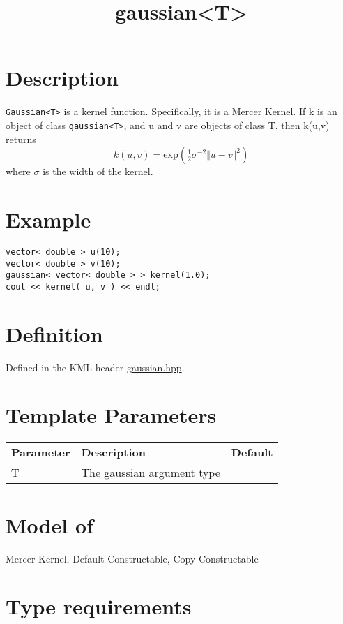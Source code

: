 \documentclass{article}
\newcommand{\half}{\tfrac{1}{2}}
\begin{document}
\title{gaussian<T>}
\maketitle

\section*{Description}

\texttt{Gaussian<T>} is a kernel function. Specifically, it is a Mercer Kernel. If k is an object of class \texttt{gaussian<T>}, and u and v are objects of class T, then k(u,v) returns
%
$$k(u,v) = \textrm{exp}( \half \sigma^{-2} \Vert u-v \Vert^2 ) $$
%
where $\sigma$ is the width of the kernel. 


\section*{Example}


\highlightcpp{}
\begin{verbatim}
vector< double > u(10);
vector< double > v(10);
gaussian< vector< double > > kernel(1.0);
cout << kernel( u, v ) << endl;
\end{verbatim}


\section*{Definition}

Defined in the KML header \href{gaussian.hpp}{gaussian.hpp}.


\section*{Template Parameters}

\begin{tabular}{lll}
\textbf{Parameter} & \textbf{Description} & \textbf{Default} \\ 
T & The gaussian argument type \\ 
\end{tabular}


\section*{Model of}

Mercer Kernel, Default Constructable, Copy Constructable


\section*{Type requirements}
\end{document}
